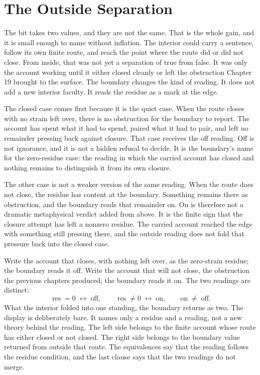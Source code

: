 \section{The Outside Separation}

The bit takes two values, and they are not the same. That is the whole gain,
and it is small enough to name without inflation. The interior could carry a
sentence, follow its own finite route, and reach the point where the route did
or did not close. From inside, that was not yet a separation of true from false.
It was only the account working until it either closed cleanly or left the
obstruction Chapter 19 brought to the surface. The boundary changes the kind of
reading. It does not add a new interior faculty. It reads the residue as a
mark at the edge.

The closed case comes first because it is the quiet case. When the route closes
with no strain left over, there is no obstruction for the boundary to report.
The account has spent what it had to spend, paired what it had to pair, and
left no remainder pressing back against closure. That case receives the off
reading. Off is not ignorance, and it is not a hidden refusal to decide. It is
the boundary's name for the zero-residue case: the reading in which the carried
account has closed and nothing remains to distinguish it from its own closure.

The other case is not a weaker version of the same reading. When the route
does not close, the residue has content at the boundary. Something remains
there as obstruction, and the boundary reads that remainder on. On is therefore
not a dramatic metaphysical verdict added from above. It is the finite sign
that the closure attempt has left a nonzero residue. The carried account
reached the edge with something still pressing there, and the outside reading
does not fold that pressure back into the closed case.

Write the account that closes, with nothing left over, as the zero-strain
residue; the boundary reads it off. Write the account that will not close, the
obstruction the previous chapters produced; the boundary reads it on. The two
readings are distinct:
\[
  \operatorname{res}=0 \;\leftrightarrow\; \text{off},
  \qquad
  \operatorname{res}\neq 0 \;\leftrightarrow\; \text{on},
  \qquad
  \text{on} \;\neq\; \text{off}.
\]
What the interior folded into one standing, the boundary returns as two. The
display is deliberately bare. It names only a residue and a reading, not a
new theory behind the reading. The left side belongs to the finite account
whose route has either closed or not closed. The right side belongs to the
boundary value returned from outside that route. The equivalences say that the
reading follows the residue condition, and the last clause says that the two
readings do not merge.

